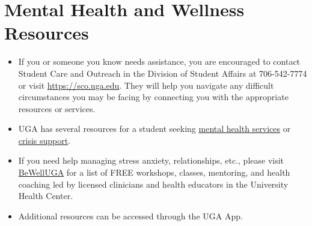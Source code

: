 \documentclass[11pt, letterpaper]{article}
\begin{document}
\section*{Mental Health and Wellness Resources}

\begin{itemize}
\item If you or someone you know needs assistance, you are encouraged to contact Student Care and Outreach in the Division of Student Affairs at 706-542-7774 or visit \href{https://sco.uga.edu}{https://sco.uga.edu}. They will help you navigate any difficult circumstances you may be facing by connecting you with the appropriate resources or services. 
\item UGA has several resources for a student seeking \href{https://www.uhs.uga.edu/bewelluga/bewelluga}{mental health services} or \href{https://www.uhs.uga.edu/info/emergencies}{crisis support}. 
\item If you need help managing stress anxiety, relationships, etc., please visit \href{https://www.uhs.uga.edu/bewelluga/bewelluga}{BeWellUGA} for a list of FREE workshops, classes, mentoring, and health coaching led by licensed clinicians and health educators in the University Health Center.
\item Additional resources can be accessed through the UGA App.
\end{itemize}



\end{document}
